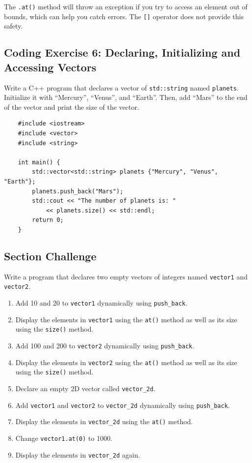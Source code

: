 \begin{remark}
	The \texttt{.at()} method will throw an exception if you try to access an element out of bounds, which can help you catch errors. The \texttt{[]} operator does not provide this safety.
\end{remark}

\subsection{Coding Exercise 6: Declaring, Initializing and Accessing Vectors}
Write a C++ program that declares a vector of \texttt{std::string} named \texttt{planets}. Initialize it with ``Mercury'', ``Venus'', and ``Earth''. Then, add ``Mars'' to the end of the vector and print the size of the vector.

\begin{lstlisting}
	#include <iostream>
	#include <vector>
	#include <string>

	int main() {
		std::vector<std::string> planets {"Mercury", "Venus", "Earth"};
		planets.push_back("Mars");
		std::cout << "The number of planets is: "
			<< planets.size() << std::endl;
		return 0;
	}
\end{lstlisting}

\subsection{Section Challenge}
Write a program that declares two empty vectors of integers named \texttt{vector1} and \texttt{vector2}.
\begin{enumerate}
	\item Add 10 and 20 to \texttt{vector1} dynamically using \texttt{push\_back}.
	\item Display the elements in \texttt{vector1} using the \texttt{at()} method as well as its size using the \texttt{size()} method.
	\item Add 100 and 200 to \texttt{vector2} dynamically using \texttt{push\_back}.
	\item Display the elements in \texttt{vector2} using the \texttt{at()} method as well as its size using the \texttt{size()} method.
	\item Declare an empty 2D vector called \texttt{vector\_2d}.
	\item Add \texttt{vector1} and \texttt{vector2} to \texttt{vector\_2d} dynamically using \texttt{push\_back}.
	\item Display the elements in \texttt{vector\_2d} using the \texttt{at()} method.
	\item Change \texttt{vector1.at(0)} to 1000.
	\item Display the elements in \texttt{vector\_2d} again.
\end{enumerate}

